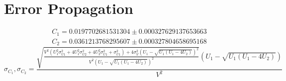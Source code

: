 \documentclass[12pt]{article}
\begin{document}
\section{Error Propagation}
\begin{align*}
    C_1 = 0.0197702681531304 \pm 0.000327629137653663 \\
    C_2 = 0.0361213768295607 \pm 0.000327804658695168
\end{align*}
\begin{equation*}
    \sigma_{C_1}, \sigma_{C_2} = \frac{\sqrt{\frac{V^{2} \left(U_{1}^{2} \sigma_{U 1}^{2} + 4 U_{1}^{2} \sigma_{U 2}^{2} + 4 U_{2}^{2} \sigma_{U 1}^{2} + \sigma_{U 1}^{2}\right) + 4 \sigma_{V}^{2} \left(U_{1} - \sqrt{U_{1} \left(U_{1} - 4 U_{2}\right)}\right)^{2}}{V^{2} \left(U_{1} - \sqrt{U_{1} \left(U_{1} - 4 U_{2}\right)}\right)^{2}}} \left(U_{1} - \sqrt{U_{1} \left(U_{1} - 4 U_{2}\right)}\right)}{V^{2}}
\end{equation*}
\end{document}
